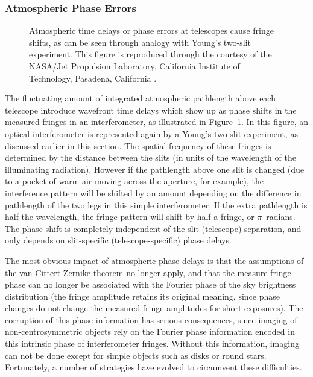\documentclass[12pt]{article}
\begin{document}
\subsubsection{Atmospheric Phase Errors}
\begin{figure}
\begin{center}
\centerline{}
\caption{Atmospheric time delays or phase errors at telescopes 
cause fringe shifts, as can be seen through analogy with Young's
two-slit experiment. This figure is reproduced through the courtesy
of the NASA/Jet Propulsion Laboratory, 
California Institute of Technology, Pasadena, California \citep{monnier_mss}.
\label{monnier_fig_1}}
\end{center}
\end{figure}

The fluctuating amount of integrated atmospheric pathlength above each
telescope introduce wavefront time delays which show up as phase
shifts in the measured fringes in an interferometer, as illustrated in
Figure~\ref{monnier_fig_1}.  In this figure, an optical interferometer
is represented again by a Young's two-slit experiment, as discussed
earlier in this section.  The spatial frequency of these
fringes is determined by the distance between the slits (in units of
the wavelength of the illuminating radiation).  However if the
pathlength above one slit is changed (due to a pocket of warm air
moving across the aperture, for example), the interference pattern
will be shifted by an amount depending on the difference in pathlength
of the two legs in this simple interferometer.  If the extra
pathlength is half the wavelength, the fringe pattern will shift by
half a fringe, or $\pi$~radians.  The phase shift is completely
independent of the slit (telescope) separation, and only depends on
slit-specific (telescope-specific) phase delays.

The most obvious impact of atmospheric phase delays is that the
assumptions of the van Cittert-Zernike theorem no longer apply, and
that the measure fringe phase can no longer be associated with the
Fourier phase of the sky brightness distribution (the fringe amplitude
retains its original meaning, since phase changes do not change the
measured fringe amplitudes for short exposures).  The corruption of
this phase information has serious consequences, since imaging of
non-centrosymmetric objects rely on the Fourier phase information
encoded in this intrinsic phase of interferometer fringes.  Without
this information, imaging can not be done except for simple  objects
such as disks or round stars.  Fortunately, a number of strategies
have evolved to circumvent these difficulties.
\end{document}
